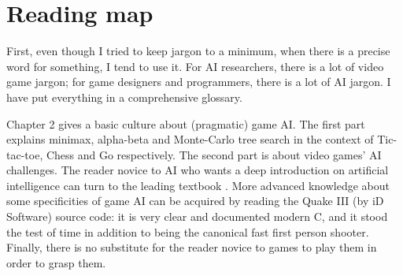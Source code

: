 

\section{Reading map}
First, even though I tried to keep jargon to a minimum, when there is a precise word for something, I tend to use it. For AI researchers, there is a lot of video game jargon; for game designers and programmers, there is a lot of AI jargon. I have put everything in a comprehensive glossary.

Chapter 2 gives a basic culture about (pragmatic) game AI. The first part explains minimax, alpha-beta and Monte-Carlo tree search in the context of Tic-tac-toe, Chess and Go respectively. The second part is about video games' AI challenges. The reader novice to AI who wants a deep introduction on artificial intelligence can turn to the leading textbook \citep{AIMA}. More advanced knowledge about some specificities of game AI can be acquired by reading the Quake III (by iD Software) source code: it is very clear and documented modern C, and it stood the test of time in addition to being the canonical fast first person shooter. Finally, there is no substitute for the reader novice to games to play them in order to grasp them.

